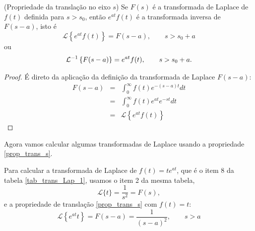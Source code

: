 \begin{teo}{\label{prop_trans_s}}(Propriedade da translação no eixo $s$) Se $F(s)$ é a transformada de Laplace de $f(t)$ definida para $s>s_0$, então $e^{at}f(t)$ é a transformada inversa de $F(s-a)$, isto é
\begin{equation}
\mathcal{L}\left\{e^{at}f(t)\right\} =F(s-a),\qquad s>s_0+a
\end{equation}
ou
\begin{equation}{\label{eq_trans_s_inv}}
\mathcal{L}^{-1} \left\{F(s-a)\right\} =e^{at}f(t),\qquad s>s_0+a.
\end{equation}
\end{teo}
\begin{proof}É direto da aplicação da definição da transformada de Laplace $F(s-a)$:
\begin{eqnarray*}
 F(s-a)&=&\int_0^\infty f(t)e^{-(s-a)t}dt\\
&=&\int_0^\infty f(t)e^{at}e^{-st}dt\\
&=&\mathcal{L}\left\{e^{at}f(t)\right\}
 \end{eqnarray*}
\end{proof}
Agora vamos calcular algumas transformadas de Laplace usando a propriedade \ref{prop_trans_s}.
\begin{ex}Para calcular a transformada de Laplace de $f(t)=te^{at}$, que é o item 8 da tabela \ref{tab_trans_Lap_1}, usamos o item 2 da mesma tabela,
\begin{equation}
\mathcal{L}\{t\}=\frac{1}{s^2}=F(s),
\end{equation}
e a propriedade de translação \ref{prop_trans_s} com $f(t)=t$:
\begin{equation}
\mathcal{L}\left\{e^{at}t\right\} =F(s-a)=\frac{1}{(s-a)^2},\qquad s>a
\end{equation}
\end{ex}
